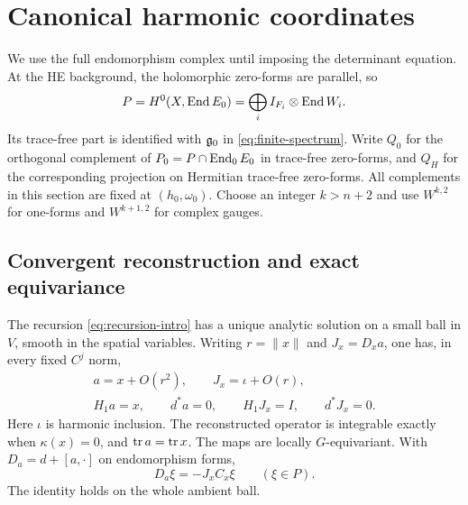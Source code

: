 \section{Canonical harmonic coordinates}\label{sec:harmonic}

We use the full endomorphism complex until imposing the determinant
equation. At the HE background, the holomorphic zero-forms are parallel,
so
\[
 P=H^0(X,\operatorname{End} E_0)=\bigoplus_i I_{F_i}\otimes\operatorname{End} W_i.
\]
Its trace-free part is identified with $\mathfrak g_0$ in
\eqref{eq:finite-spectrum}. Write $Q_0$ for the orthogonal complement
of $P_0=P\cap\operatorname{End}_0E_0$ in trace-free zero-forms, and $Q_H$ for the
corresponding projection on Hermitian trace-free zero-forms.
All complements in this section are fixed at $(h_0,\omega_0)$.
Choose an integer $k>n+2$ and use $W^{k,2}$ for one-forms and
$W^{k+1,2}$ for complex gauges.

\subsection{Convergent reconstruction and exact equivariance}

\begin{lemma}\label{lem:kuranishi}
The recursion \eqref{eq:recursion-intro} has a unique analytic solution
on a small ball in $V$, smooth in the spatial variables. Writing
$r=\|x\|$ and $J_x=D_xa$, one has, in every fixed $C^j$ norm,
\begin{equation}\label{eq:canonical-estimates}
 \begin{gathered}
 a=x+O(r^2),\qquad J_x=\iota+O(r),\\
 H_1a=x,\qquad d^*a=0,\qquad H_1J_x=I,\qquad d^*J_x=0 .
 \end{gathered}
\end{equation}
Here $\iota$ is harmonic inclusion. The reconstructed operator is
integrable exactly when $\kappa(x)=0$, and $\operatorname{tr} a=\operatorname{tr} x$.
The maps are locally $G$-equivariant. With
$D_a=d+[a,\cdot]$ on endomorphism forms,
\begin{equation}\label{eq:exact-action}
 D_a\xi=-J_xC_x\xi\qquad(\xi\in P).
\end{equation}
The identity holds on the whole ambient ball.
\end{lemma}

